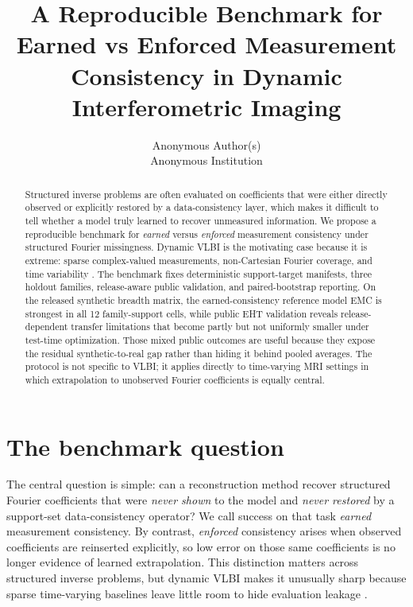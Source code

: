 \documentclass{article}
\title{A Reproducible Benchmark for Earned vs Enforced Measurement Consistency in Dynamic Interferometric Imaging}
\author{%
  Anonymous Author(s)\\
  Anonymous Institution
}
\begin{document}
\maketitle

\begin{abstract}
Structured inverse problems are often evaluated on coefficients that were either directly observed or explicitly restored by a data-consistency layer, which makes it difficult to tell whether a model truly learned to recover unmeasured information. We propose a reproducible benchmark for \emph{earned} versus \emph{enforced} measurement consistency under structured Fourier missingness. Dynamic VLBI is the motivating case because it is extreme: sparse complex-valued measurements, non-Cartesian Fourier coverage, and time variability \citep{EHT2019M87I,ngEHTScience}. The benchmark fixes deterministic support-target manifests, three holdout families, release-aware public validation, and paired-bootstrap reporting. On the released synthetic breadth matrix, the earned-consistency reference model EMC is strongest in all 12 family-support cells, while public EHT validation reveals release-dependent transfer limitations that become partly but not uniformly smaller under test-time optimization. Those mixed public outcomes are useful because they expose the residual synthetic-to-real gap rather than hiding it behind pooled averages. The protocol is not specific to VLBI; it applies directly to time-varying MRI settings in which extrapolation to unobserved Fourier coefficients is equally central.
\end{abstract}

\section{The benchmark question}

The central question is simple: can a reconstruction method recover structured Fourier coefficients that were \emph{never shown} to the model and \emph{never restored} by a support-set data-consistency operator? We call success on that task \emph{earned} measurement consistency. By contrast, \emph{enforced} consistency arises when observed coefficients are reinserted explicitly, so low error on those same coefficients is no longer evidence of learned extrapolation. This distinction matters across structured inverse problems, but dynamic VLBI makes it unusually sharp because sparse time-varying baselines leave little room to hide evaluation leakage \citep{EHT2019M87IV,EHT2022SgrAIII}.
\end{document}
